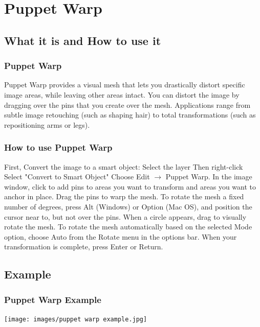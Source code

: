 \documentclass{beamer}
\begin{document}
\section{Puppet Warp}

\subsection{What it is and How to use it}		

\begin{frame}
	\frametitle{Puppet Warp}
	\begin{outline}
		\1 Puppet Warp provides a visual mesh that lets you drastically distort specific image areas, while leaving other areas intact. 
		\1 You can distort the image by dragging over the pins that you create over the mesh.
		\1 Applications range from subtle image retouching (such as shaping hair) to total transformations (such as repositioning arms or legs).
	\end{outline}
\end{frame}

	\begin{frame}
	\frametitle{How to use Puppet Warp}
	\begin{outline}
		\1 First, Convert the image to a smart object:
		\2 Select the layer
		\2 Then right-click
		\2 Select "Convert to Smart Object"
		\1 Choose Edit $\rightarrow$ Puppet Warp. 
		\1 In the image window, click to add pins to areas you want to transform and areas you want to anchor in place.
		\1 Drag the pins to warp the mesh.
		\1 To rotate the mesh a fixed number of degrees, press Alt (Windows) or Option (Mac OS), and position the cursor near to, but not over the pins. 
		\2 When a circle appears, drag to visually rotate the mesh.
		\2 To rotate the mesh automatically based on the selected Mode option, choose Auto from the Rotate menu in the options bar.  
		\1 When your transformation is complete, press Enter or Return.
	\end{outline}
\end{frame}

\subsection{Example}		
\begin{frame}
	\frametitle{Puppet Warp Example}
	\begin{center}
		\texttt{[image: images/puppet warp example.jpg]}
	\end{center}
\end{frame}
\end{document}
